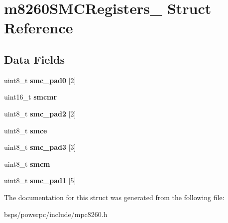 \hypertarget{structm8260SMCRegisters__}{}\section{m8260\+S\+M\+C\+Registers\+\_\+ Struct Reference}
\label{structm8260SMCRegisters__}
\subsection*{Data Fields}
\begin{DoxyCompactItemize}
\item 
\mbox{\label{structm8260SMCRegisters___aaf7dfbe30ca8b7123301a769c069b063}} 
uint8\+\_\+t {\bfseries smc\+\_\+pad0} \mbox{[}2\mbox{]}
\item 
\mbox{\label{structm8260SMCRegisters___aee5c550ebff5ca42a763a0be1c33846d}} 
uint16\+\_\+t {\bfseries smcmr}
\item 
\mbox{\label{structm8260SMCRegisters___abf256ad3c47da256ae5453157fbf3350}} 
uint8\+\_\+t {\bfseries smc\+\_\+pad2} \mbox{[}2\mbox{]}
\item 
\mbox{\label{structm8260SMCRegisters___aabe39cfeff45f6f7a804664af90e9bb3}} 
uint8\+\_\+t {\bfseries smce}
\item 
\mbox{\label{structm8260SMCRegisters___a5d0ac7462225a394d6f2903f0c449813}} 
uint8\+\_\+t {\bfseries smc\+\_\+pad3} \mbox{[}3\mbox{]}
\item 
\mbox{\label{structm8260SMCRegisters___a2fd22f52cdc136ee6783bca1a1514b6d}} 
uint8\+\_\+t {\bfseries smcm}
\item 
\mbox{\label{structm8260SMCRegisters___acff3b3e827dbf6cfd00da7b381e9acdc}} 
uint8\+\_\+t {\bfseries smc\+\_\+pad1} \mbox{[}5\mbox{]}
\end{DoxyCompactItemize}


The documentation for this struct was generated from the following file\+:\begin{DoxyCompactItemize}
\item 
bsps/powerpc/include/mpc8260.\+h\end{DoxyCompactItemize}
